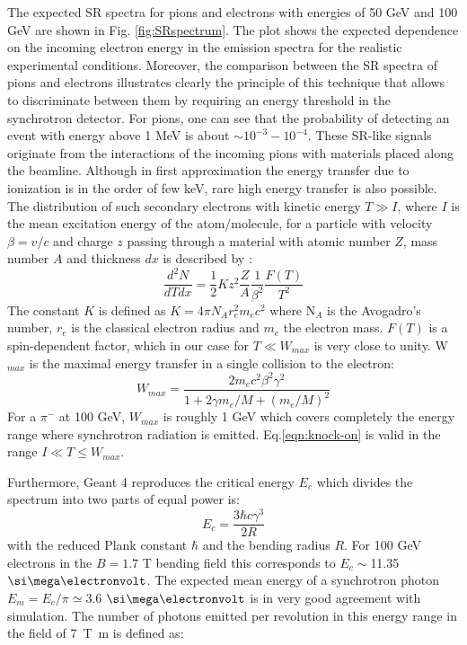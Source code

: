 The expected SR spectra for pions and electrons with energies of 50 GeV and 100 GeV are shown in Fig. \ref{fig:SRspectrum}. The plot shows the expected dependence on the incoming electron energy in the emission spectra for the realistic experimental conditions. Moreover, the comparison between the SR spectra of pions and electrons illustrates clearly the principle of this technique that allows to discriminate between them by requiring an energy threshold in the synchrotron detector.  For pions, one can see that the probability of detecting an event with energy above 1 MeV is about $\sim 10^{-3}-10^{-4}$.
These SR-like signals originate from the interactions of the incoming pions with materials placed along the beamline. Although in first approximation the energy transfer due to ionization is in the order of few \si{\kilo\electronvolt}, rare high energy transfer is also possible. The distribution of such secondary electrons with
kinetic energy $T\gg I$, where $I$ is the mean excitation energy of the
atom/molecule, for a particle with velocity $\beta=v/c$ and charge $z$
passing through a material with atomic number $Z$, mass number $A$ and
thickness $dx$ is described by \cite{review-particle-physics}:
\begin{equation}
\frac{d^2N}{dTdx} = \frac{1}{2}K z^2 \frac{Z}{A}
\frac{1}{\beta^2}\frac{F(T)}{T^2}
\label{eqn:knock-on}
\end{equation}
The constant $K$ is defined as $K=4\pi N_A r_e^2 m_e c^2$ where N$_A$ is
the Avogadro's number, $r_e$ is the classical electron radius and $m_e$
the electron mass.
$F(T)$ is a spin-dependent factor, which in our case for $T \ll W_{max}$
is very close to unity. W$_{max}$ is the maximal energy transfer in a single collision to the
electron:
\begin{equation}
W_{max} = \frac{2m_e c^2 \beta^2 \gamma^2}{1+ 2\gamma m_e/M+(m_e/M)^2}
\end{equation}
For a $\pi^-$ at 100 GeV, $W_{max}$ is roughly 1 GeV which
covers completely the energy range where synchrotron radiation is
emitted. Eq.\ref{eqn:knock-on} is valid in the range $I\ll T \leq W_{max}$.
 \par 
Furthermore, Geant 4 reproduces the critical energy $E_c$ which divides the spectrum into two parts of equal power is:
\begin{equation}
E_c = \frac{3 \hbar c \gamma^3}{2R}
\end{equation}
with the reduced Plank constant $\hbar$ and the bending radius $R$. 
 For 100 GeV electrons in the  $B=1.7$ T bending field this corresponds to $E_c\sim$11.35 $\mev$. The expected mean energy of a synchrotron photon $E_m=E_c/\pi\simeq 3.6$ $\mev$ is in very good agreement with simulation. The number of photons emitted per revolution in this energy range in the field of \SI{7}{\tesla\meter} is defined as:
